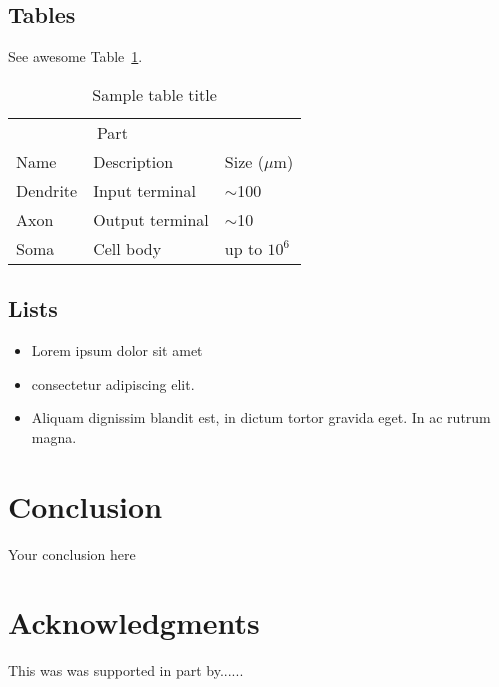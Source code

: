 \documentclass{article}
\begin{document}
\subsection{Tables}
\lipsum[12]
See awesome Table~\ref{tab:table}.

\begin{table}
 \caption{Sample table title}
  \centering
  \begin{tabular}{lll}
    \toprule
    \multicolumn{2}{c}{Part}                   \\
    \cmidrule(r){1-2}
    Name     & Description     & Size ($\mu$m) \\
    \midrule
    Dendrite & Input terminal  & $\sim$100     \\
    Axon     & Output terminal & $\sim$10      \\
    Soma     & Cell body       & up to $10^6$  \\
    \bottomrule
  \end{tabular}
  \label{tab:table}
\end{table}

\subsection{Lists}
\begin{itemize}
\item Lorem ipsum dolor sit amet
\item consectetur adipiscing elit. 
\item Aliquam dignissim blandit est, in dictum tortor gravida eget. In ac rutrum magna.
\end{itemize}


\section{Conclusion}
Your conclusion here

\section*{Acknowledgments}
This was was supported in part by......

  
  
\end{document}
